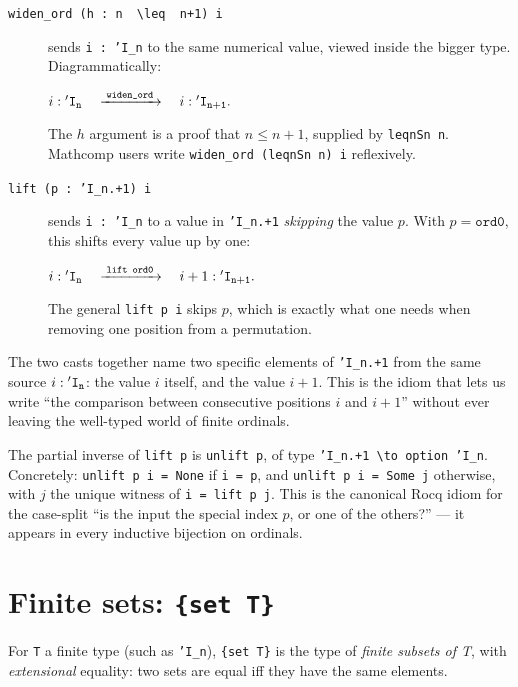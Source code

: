 \begin{description}
  \item[\texttt{widen\_ord (h : n \,\textbackslash leq\, n+1) i}]
    sends \texttt{i : 'I\_n} to the same numerical value, viewed
    inside the bigger type. Diagrammatically:
    \begin{center}
      $i : \mathtt{'I_{n}} \quad\xrightarrow{\;\texttt{widen\_ord}\;}\quad i : \mathtt{'I_{n+1}}.$
    \end{center}
    The $h$ argument is a proof that $n \leq n+1$, supplied by
    \texttt{leqnSn n}. Mathcomp users write
    \texttt{widen\_ord (leqnSn n) i} reflexively.

  \item[\texttt{lift (p : 'I\_n.+1) i}]
    sends \texttt{i : 'I\_n} to a value in \texttt{'I\_n.+1}
    \emph{skipping} the value $p$. With $p = \texttt{ord0}$, this
    shifts every value up by one:
    \begin{center}
      $i : \mathtt{'I_{n}} \quad\xrightarrow{\;\texttt{lift ord0}\;}\quad i+1 : \mathtt{'I_{n+1}}.$
    \end{center}
    The general \texttt{lift p i} skips $p$, which is exactly what
    one needs when removing one position from a permutation.
\end{description}

\noindent The two casts together name two specific elements of
\texttt{'I\_n.+1} from the same source $i : \mathtt{'I_{n}}$: the value $i$
itself, and the value $i+1$. This is the idiom that lets us write
``the comparison between consecutive positions $i$ and $i+1$''
without ever leaving the well-typed world of finite ordinals.

The partial inverse of \texttt{lift p} is \texttt{unlift p}, of
type \texttt{'I\_n.+1\,\textbackslash to\,option 'I\_n}. Concretely:
\texttt{unlift p i = None} if \texttt{i = p}, and
\texttt{unlift p i = Some j} otherwise, with $j$ the unique witness
of \texttt{i = lift p j}. This is the canonical Rocq idiom for the
case-split ``is the input the special index $p$, or one of the
others?'' --- it appears in every inductive bijection on ordinals.

\section{Finite sets: \texttt{\{set T\}}}

For \texttt{T} a finite type (such as \texttt{'I\_n}),
\texttt{\{set T\}} is the type of \emph{finite subsets of T}, with
\emph{extensional} equality: two sets are equal iff they have the
same elements.

